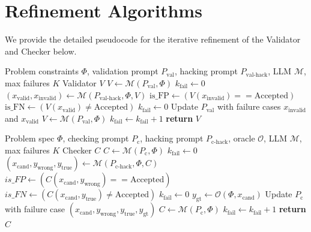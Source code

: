 \documentclass[11pt]{article}
\begin{document}
\section{Refinement Algorithms}
\label{appx:algos}

We provide the detailed pseudocode for the iterative refinement of the Validator and Checker below.


\begin{algorithm}[h]
\small
\caption{Iterative LLM-based Refinement of Validator}
\label{algo:validator}
\begin{algorithmic}[1]
\REQUIRE Problem constraints $\Phi$, validation prompt $P_{\text{val}}$, hacking prompt $P_{\text{val-hack}}$, LLM $\mathcal{M}$, max failures $K$
\ENSURE Validator $V$
\STATE $V \leftarrow \mathcal{M}(P_{\text{val}}, \Phi)$
\STATE $k_{\text{fail}} \leftarrow 0$
    \STATE $(x_{\text{valid}}, x_{\text{invalid}}) \leftarrow \mathcal{M}(P_{\text{val-hack}}, \Phi, V)$
    \STATE $\text{is\_FP} \leftarrow (V(x_{\text{invalid}}) == \text{Accepted})$
    \STATE $\text{is\_FN} \leftarrow (V(x_{\text{valid}}) \neq \text{Accepted})$
        \STATE $k_{\text{fail}} \leftarrow 0$
        \STATE Update $P_{\text{val}}$ with failure cases $x_{\text{invalid}}$ and $x_{\text{valid}}$
        \STATE $V \leftarrow \mathcal{M}(P_{\text{val}}, \Phi)$
    \ELSE
        \STATE $k_{\text{fail}} \leftarrow k_{\text{fail}} + 1$
    \ENDIF
\ENDWHILE
\STATE \textbf{return} $V$
\end{algorithmic}
\end{algorithm}

\begin{algorithm}[h]
\small
\caption{Iterative LLM-based Refinement of Checker}
\label{algo:checker}
\begin{algorithmic}[1]
\REQUIRE Problem spec $\Phi$, checking prompt $P_{\text{c}}$, hacking prompt $P_{\text{c-hack}}$, oracle $\mathcal{O}$, LLM $\mathcal{M}$, max failures $K$
\ENSURE Checker $C$
\STATE $C \leftarrow \mathcal{M}(P_{\text{c}}, \Phi)$
\STATE $k_{\text{fail}} \leftarrow 0$
    \STATE $(x_{\text{cand}}, y_{\text{wrong}}, y_{\text{true}}) \leftarrow \mathcal{M}(P_{\text{c-hack}}, \Phi, C)$
    \STATE $is\_FP \leftarrow (C(x_{\text{cand}}, y_{\text{wrong}}) == \text{Accepted})$
    \STATE $is\_FN \leftarrow (C(x_{\text{cand}}, y_{\text{true}}) \neq \text{Accepted})$
        \STATE $k_{\text{fail}} \leftarrow 0$
        \STATE $y_{\text{gt}} \leftarrow \mathcal{O}(\Phi, x_{\text{cand}})$ 
        \STATE Update $P_{\text{c}}$ with failure case $(x_{\text{cand}}, y_{\text{wrong}}, y_{\text{true}},y_{\text{gt}})$
\STATE $C \leftarrow \mathcal{M}(P_{\text{c}}, \Phi)$
    \ELSE
        \STATE $k_{\text{fail}} \leftarrow k_{\text{fail}} + 1$
    \ENDIF
\ENDWHILE
\STATE \textbf{return} $C$
\end{algorithmic}
\end{algorithm}
\end{document}
